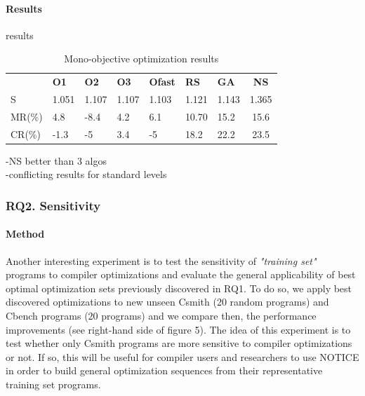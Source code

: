 \paragraph{Results}
results


\begin{table}[h]
	\centering
	\caption{Mono-objective optimization results}
	\label{my-label}
	\begin{tabular}{|l|l|l|l|l|l|l|c|}
		\hline
		& \textbf{O1}                    & \textbf{O2}                    & \textbf{O3}                    & \textbf{Ofast}                 & \textbf{RS}                    & \textbf{GA}                    & 
		\textbf{NS} \\
		\hhline{|=|=|=|=|=|=|=|=|}
		S  &  1.051 & 1.107  & 1.107  & 1.103  & 1.121  &  1.143 &  1.365  \\ \hline
		MR(\%) & 4.8  & -8.4  &  4.2 & 6.1  &  10.70 & 15.2  &  15.6  \\ \hline
		CR(\%) & -1.3  & -5  & 3.4  & -5  &  18.2 & 22.2  &  23.5  \\ \hline
	\end{tabular}
\end{table}
-NS better than 3 algos\\
-conflicting results for standard levels

\noindent{}
\subsubsection{RQ2. Sensitivity}
\paragraph{Method}
Another interesting experiment is to test the sensitivity of \textit{"training set"} programs to compiler optimizations and evaluate the general applicability of best optimal optimization sets previously discovered in RQ1. To do so, we apply best discovered optimizations to new unseen Csmith (20 random programs) and Cbench programs (20 programs) and we compare then, the performance improvements (see right-hand side of figure 5). The idea of this experiment is to test whether only Csmith programs are more sensitive to compiler optimizations or not. If so, this will be useful for compiler users and researchers to use NOTICE in order to build general optimization sequences from their representative training set programs.

